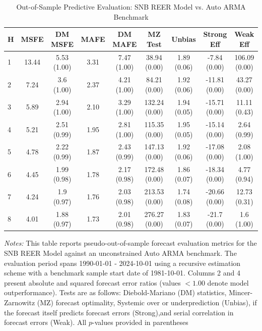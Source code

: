 \begin{table}[htbp]
\centering
\caption{Out-of-Sample Predictive Evaluation: SNB REER Model vs. Auto ARMA Benchmark}
\label{tab:snb_reer_model_evaluation}
\footnotesize
\begin{tabular}{l cccccccc}
\hline\hline
\rule{0pt}{3ex}
\textbf{H} & \textbf{MSFE} & \textbf{DM MSFE} & \textbf{MAFE} & \textbf{DM MAFE} & \textbf{MZ Test} & \textbf{Unbias} & \textbf{Strong Eff} & \textbf{Weak Eff} \\[0.5ex]
\hline
\rule{0pt}{2.5ex}
1 & 13.44 & 5.53 (1.00) & 3.31 & 7.47 (1.00) & 38.94 (0.00) & 1.89 (0.06) & -7.84 (0.00) & 106.09 (0.00) \\
2 & 7.24 & 3.6 (1.00) & 2.37 & 4.21 (1.00) & 84.21 (0.00) & 1.92 (0.06) & -11.81 (0.00) & 43.27 (0.00) \\
3 & 5.89 & 2.94 (1.00) & 2.10 & 3.29 (1.00) & 132.24 (0.00) & 1.94 (0.05) & -15.71 (0.00) & 11.11 (0.43) \\
4 & 5.21 & 2.51 (0.99) & 1.95 & 2.81 (1.00) & 115.35 (0.00) & 1.95 (0.05) & -15.14 (0.00) & 2.64 (0.99) \\
5 & 4.78 & 2.22 (0.99) & 1.87 & 2.43 (0.99) & 147.13 (0.00) & 1.92 (0.06) & -17.08 (0.00) & 2.08 (1.00) \\
6 & 4.45 & 1.99 (0.98) & 1.78 & 2.17 (0.98) & 172.48 (0.00) & 1.86 (0.07) & -18.34 (0.00) & 4.77 (0.94) \\
7 & 4.24 & 1.9 (0.97) & 1.76 & 2.03 (0.98) & 213.53 (0.00) & 1.74 (0.08) & -20.66 (0.00) & 12.73 (0.31) \\
8 & 4.01 & 1.88 (0.97) & 1.73 & 2.01 (0.98) & 276.27 (0.00) & 1.83 (0.07) & -21.7 (0.00) & 1.6 (1.00) \\
\hline\hline
\end{tabular}%
\par\smallskip
\parbox{\textwidth}{\scriptsize \textit{Notes:} This table reports pseudo-out-of-sample forecast evaluation metrics for the SNB REER Model against an unconstrained Auto ARMA benchmark. The evaluation period spans 1990-01-01 - 2024-10-01 using a recursive estimation scheme with a benchmark sample start date of 1981-10-01. Columns 2 and 4 present absolute and squared forecast error ratios (values $< 1.00$ denote model outperformance). Tests are as follows: Diebold-Mariano (DM) statistics, Mincer-Zarnowitz (MZ) forecast optimality, Systemic over or underprediction (Unbias), if the forecast itself predicts forecast errors (Strong),and serial correlation in forecast errors (Weak). All $p$-values provided in parentheses}
\end{table}
